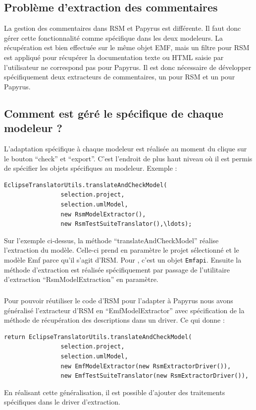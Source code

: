 \subsection{Problème d'extraction des commentaires}

La gestion des commentaires dans RSM et Papyrus est différente.
Il faut donc gérer cette fonctionnalité comme spécifique dans les deux modeleurs.
La récupération est bien effectuée sur le même objet EMF, mais un filtre pour RSM est appliqué pour récupérer la documentation texte ou HTML saisie par l'utilisateur ne correspond pas pour Papyrus.
Il est donc nécessaire de développer spécifiquement deux extracteurs de commentaires, un pour RSM et un pour Papyrus.

\subsection{Comment est géré le spécifique de chaque modeleur ?}

L'adaptation spécifique à chaque modeleur est réalisée au moment du clique sur le bouton ``check'' et ``export''. 
C'est l'endroit de plus haut niveau où il est permis de spécifier les objets spécifiques au modeleur.
Exemple : 
\begin{verbatim}
EclipseTranslatorUtils.translateAndCheckModel(
                selection.project,
                selection.umlModel,
                new RsmModelExtractor(),
                new RsmTestSuiteTranslator(),\ldots);
\end{verbatim}
Sur l'exemple ci-dessus, la méthode ``translateAndCheckModel'' réalise l'extraction du modèle. 
Celle-ci prend en paramètre le projet sélectionné et le modèle Emf parce qu'il s'agit d'RSM. 
Pour \together, c'est un objet \texttt{Emfapi}.
Ensuite la méthode d'extraction est réalisée spécifiquement par passage de l'utilitaire d'extraction ``RsmModelExtraction'' en paramètre.

\subparagraph{}
Pour pouvoir réutiliser le code d'RSM pour l'adapter à Papyrus nous avons généralisé l'extracteur d'RSM en ``EmfModelExtractor'' avec spécification de la méthode de récupération des descriptions dans un driver. Ce qui donne :
\begin{verbatim}
return EclipseTranslatorUtils.translateAndCheckModel(
                selection.project,
                selection.umlModel,
                new EmfModelExtractor(new RsmExtractorDriver()),
                new EmfTestSuiteTranslator(new RsmExtractorDriver()),
\end{verbatim}
En réalisant cette généralisation, il est possible d'ajouter des traitements spécifiques dans le driver d'extraction.

